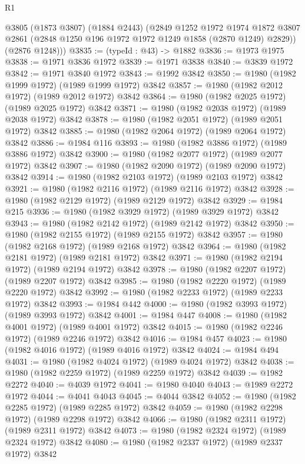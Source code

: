 \begin{lexlean}{R1}
\begin{coremodule}
      @3805
        (@1873 @3807)
        (@1884 @2443)
        (@2849
          @1252
          @1972
          @1974
          @1872
          @3807
          @2861
          (@2848 @1250 @196 @1972 @1972 @1249 @1858 (@2870 @1249) @2829))
        (@2876 @1248)))
@3835 := (typeId : @43) -> @1882
@3836 := @1973 @1975
@3838 := @1971 @3836 @1972
@3839 := @1971 @3838
@3840 := @3839 @1972
@3842 := @1971 @3840 @1972
@3843 := @1992 @3842
@3850 := @1980 (@1982 @1999 @1972) (@1989 @1999 @1972) @3842
@3857 := @1980 (@1982 @2012 @1972) (@1989 @2012 @1972) @3842
@3864 := @1980 (@1982 @2025 @1972) (@1989 @2025 @1972) @3842
@3871 := @1980 (@1982 @2038 @1972) (@1989 @2038 @1972) @3842
@3878 := @1980 (@1982 @2051 @1972) (@1989 @2051 @1972) @3842
@3885 := @1980 (@1982 @2064 @1972) (@1989 @2064 @1972) @3842
@3886 := @1984 @116
@3893 := @1980 (@1982 @3886 @1972) (@1989 @3886 @1972) @3842
@3900 := @1980 (@1982 @2077 @1972) (@1989 @2077 @1972) @3842
@3907 := @1980 (@1982 @2090 @1972) (@1989 @2090 @1972) @3842
@3914 := @1980 (@1982 @2103 @1972) (@1989 @2103 @1972) @3842
@3921 := @1980 (@1982 @2116 @1972) (@1989 @2116 @1972) @3842
@3928 := @1980 (@1982 @2129 @1972) (@1989 @2129 @1972) @3842
@3929 := @1984 @215
@3936 := @1980 (@1982 @3929 @1972) (@1989 @3929 @1972) @3842
@3943 := @1980 (@1982 @2142 @1972) (@1989 @2142 @1972) @3842
@3950 := @1980 (@1982 @2155 @1972) (@1989 @2155 @1972) @3842
@3957 := @1980 (@1982 @2168 @1972) (@1989 @2168 @1972) @3842
@3964 := @1980 (@1982 @2181 @1972) (@1989 @2181 @1972) @3842
@3971 := @1980 (@1982 @2194 @1972) (@1989 @2194 @1972) @3842
@3978 := @1980 (@1982 @2207 @1972) (@1989 @2207 @1972) @3842
@3985 := @1980 (@1982 @2220 @1972) (@1989 @2220 @1972) @3842
@3992 := @1980 (@1982 @2233 @1972) (@1989 @2233 @1972) @3842
@3993 := @1984 @442
@4000 := @1980 (@1982 @3993 @1972) (@1989 @3993 @1972) @3842
@4001 := @1984 @447
@4008 := @1980 (@1982 @4001 @1972) (@1989 @4001 @1972) @3842
@4015 := @1980 (@1982 @2246 @1972) (@1989 @2246 @1972) @3842
@4016 := @1984 @457
@4023 := @1980 (@1982 @4016 @1972) (@1989 @4016 @1972) @3842
@4024 := @1984 @494
@4031 := @1980 (@1982 @4024 @1972) (@1989 @4024 @1972) @3842
@4038 := @1980 (@1982 @2259 @1972) (@1989 @2259 @1972) @3842
@4039 := @1982 @2272
@4040 := @4039 @1972
@4041 := @1980 @4040
@4043 := @1989 @2272 @1972
@4044 := @4041 @4043
@4045 := @4044 @3842
@4052 := @1980 (@1982 @2285 @1972) (@1989 @2285 @1972) @3842
@4059 := @1980 (@1982 @2298 @1972) (@1989 @2298 @1972) @3842
@4066 := @1980 (@1982 @2311 @1972) (@1989 @2311 @1972) @3842
@4073 := @1980 (@1982 @2324 @1972) (@1989 @2324 @1972) @3842
@4080 := @1980 (@1982 @2337 @1972) (@1989 @2337 @1972) @3842

\end{coremodule}
\end{lexlean}
